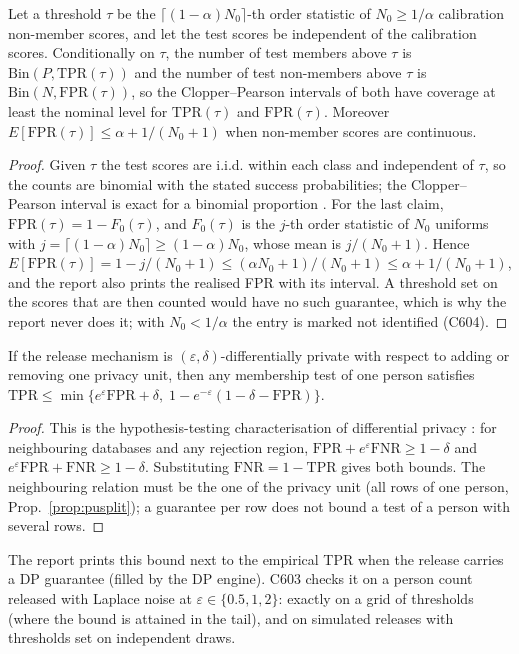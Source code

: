\setcounter{proposition}{603}
\begin{proposition}\label{prop:putpr}
Let a threshold $\tau$ be the $\lceil(1-\alpha)N_0\rceil$-th order statistic of $N_0\ge1/\alpha$ calibration non-member scores, and let the test scores be independent of the calibration scores. Conditionally on $\tau$, the number of test members above $\tau$ is $\mathrm{Bin}(P,\mathrm{TPR}(\tau))$ and the number of test non-members above $\tau$ is $\mathrm{Bin}(N,\mathrm{FPR}(\tau))$, so the Clopper--Pearson intervals of both have coverage at least the nominal level for $\mathrm{TPR}(\tau)$ and $\mathrm{FPR}(\tau)$. Moreover $E[\mathrm{FPR}(\tau)]\le\alpha+1/(N_0+1)$ when non-member scores are continuous.
\end{proposition}
\begin{proof}
Given $\tau$ the test scores are i.i.d. within each class and independent of $\tau$, so the counts are binomial with the stated success probabilities; the Clopper--Pearson interval is exact for a binomial proportion \cite{clopper1934}. For the last claim, $\mathrm{FPR}(\tau)=1-F_0(\tau)$, and $F_0(\tau)$ is the $j$-th order statistic of $N_0$ uniforms with $j=\lceil(1-\alpha)N_0\rceil\ge(1-\alpha)N_0$, whose mean is $j/(N_0+1)$. Hence $E[\mathrm{FPR}(\tau)]=1-j/(N_0+1)\le(\alpha N_0+1)/(N_0+1)\le\alpha+1/(N_0+1)$, and the report also prints the realised FPR with its interval. A threshold set on the scores that are then counted would have no such guarantee, which is why the report never does it; with $N_0<1/\alpha$ the entry is marked not identified (C604).
\end{proof}

\setcounter{proposition}{602}
\begin{proposition}\label{prop:pudp}
If the release mechanism is $(\varepsilon,\delta)$-differentially private with respect to adding or removing one privacy unit, then any membership test of one person satisfies $\mathrm{TPR}\le\min\{e^{\varepsilon}\mathrm{FPR}+\delta,\;1-e^{-\varepsilon}(1-\delta-\mathrm{FPR})\}$.
\end{proposition}
\begin{proof}
This is the hypothesis-testing characterisation of differential privacy \cite[Thm.~2.1]{kairouz2015}: for neighbouring databases and any rejection region, $\mathrm{FPR}+e^{\varepsilon}\mathrm{FNR}\ge1-\delta$ and $e^{\varepsilon}\mathrm{FPR}+\mathrm{FNR}\ge1-\delta$. Substituting $\mathrm{FNR}=1-\mathrm{TPR}$ gives both bounds. The neighbouring relation must be the one of the privacy unit (all rows of one person, Prop.~\ref{prop:pusplit}); a guarantee per row does not bound a test of a person with several rows.
\end{proof}
\noindent The report prints this bound next to the empirical TPR when the release carries a DP guarantee (filled by the DP engine). C603 checks it on a person count released with Laplace noise at $\varepsilon\in\{0.5,1,2\}$: exactly on a grid of thresholds (where the bound is attained in the tail), and on simulated releases with thresholds set on independent draws.

